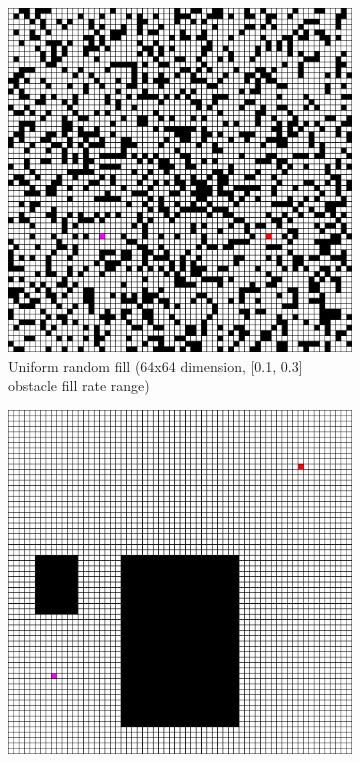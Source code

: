 \begin{figure}[h!]
  \centering
  \begin{subfigure}[b]{0.3\linewidth}
    \includegraphics[width=\linewidth]{images/screenshot_52.png}
     \caption{Uniform random fill (64x64 dimension, [0.1, 0.3] obstacle fill rate range)\newline}
  \end{subfigure}
  \hfill
  \begin{subfigure}[b]{0.3\linewidth}
    \includegraphics[width=\linewidth]{images/screenshot_54.png}

\end{subfigure}
\end{figure}
